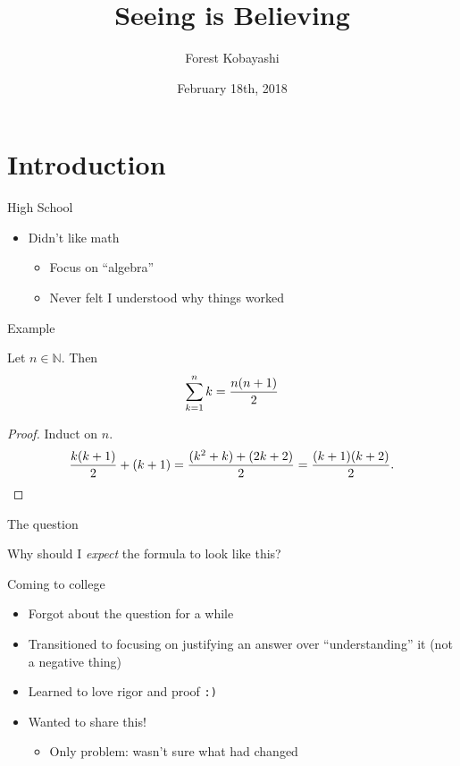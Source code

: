 \documentclass{fkpresentation}
\title{\textmd{Seeing is Believing}}
\author{Forest Kobayashi}
\institute{Harvey Mudd College}
\date{February 18th, 2018}
\begin{document}
\frame{\titlepage}
\section{Introduction}

\begin{frame}{High School}
  \begin{itemize}
  \item Didn't like math
    \begin{itemize}
      \item Focus on ``algebra''
      \item Never felt I understood why things worked
    \end{itemize}
  \end{itemize}
\end{frame}
\begin{frame}{Example}{}
  \begin{theorem}
    Let $n \in \mathbb{N}$. Then
    \[\small
      \sum_{k=1}^n k = \frac{n(n+1)}{2}
    \]
  \end{theorem}
  \begin{proof}\pause
    Induct on $n$.
    \[\small
      \frac{k(k+1)}{2} + (k+1) = \frac{(k^2 + k) + (2k+2)}{2} = \frac{(k+1)(k+2)}{2}.
    \]
  \end{proof}
\end{frame}
\begin{frame}{The question}
  \vfill
  \begin{center}\Large
    Why should I \emph{expect} the formula to look like this?
  \end{center}
  \vfill
\end{frame}
\begin{frame}{Coming to college}
  \begin{itemize}
    \item Forgot about the question for a while
    \item Transitioned to focusing on justifying an answer over
      ``understanding'' it (not a negative thing)
    \item Learned to love rigor and proof \texttt{:)}
    \item Wanted to share this!
      \begin{itemize}
        \item Only problem: wasn't sure what had changed
      \end{itemize}
  \end{itemize}
\end{frame}
\end{document}
